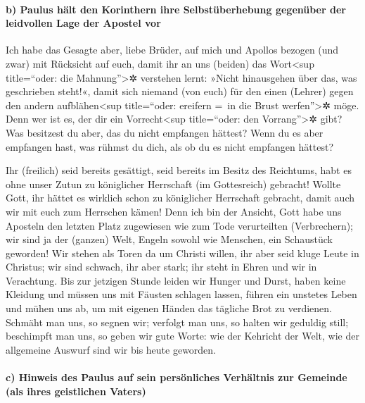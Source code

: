 \hypertarget{b-paulus-huxe4lt-den-korinthern-ihre-selbstuxfcberhebung-gegenuxfcber-der-leidvollen-lage-der-apostel-vor}{%
\paragraph{b) Paulus hält den Korinthern ihre Selbstüberhebung gegenüber
der leidvollen Lage der Apostel
vor}\label{b-paulus-huxe4lt-den-korinthern-ihre-selbstuxfcberhebung-gegenuxfcber-der-leidvollen-lage-der-apostel-vor}}

 Ich habe das Gesagte aber, liebe Brüder, auf mich und
Apollos bezogen (und zwar) mit Rücksicht auf euch, damit ihr an uns
(beiden) das Wort\textless sup title=``oder: die Mahnung''\textgreater✲
verstehen lernt: »Nicht hinausgehen über das, was geschrieben steht!«,
damit sich niemand (von euch) für den einen (Lehrer) gegen den andern
aufblähen\textless sup title=``oder: ereifern =~in die Brust
werfen''\textgreater✲ möge.  Denn wer ist es, der dir ein
Vorrecht\textless sup title=``oder: den Vorrang''\textgreater✲ gibt? Was
besitzest du aber, das du nicht empfangen hättest? Wenn du es aber
empfangen hast, was rühmst du dich, als ob du es nicht empfangen
hättest?

 Ihr (freilich) seid bereits gesättigt, seid bereits im
Besitz des Reichtums, habt es ohne unser Zutun zu königlicher Herrschaft
(im Gottesreich) gebracht! Wollte Gott, ihr hättet es wirklich schon zu
königlicher Herrschaft gebracht, damit auch wir mit euch zum Herrschen
kämen!  Denn ich bin der Ansicht, Gott habe uns Aposteln
den letzten Platz zugewiesen wie zum Tode verurteilten (Verbrechern);
wir sind ja der (ganzen) Welt, Engeln sowohl wie Menschen, ein
Schaustück geworden!  Wir stehen als Toren da um Christi
willen, ihr aber seid kluge Leute in Christus; wir sind schwach, ihr
aber stark; ihr steht in Ehren und wir in Verachtung. 
Bis zur jetzigen Stunde leiden wir Hunger und Durst, haben keine
Kleidung und müssen uns mit Fäusten schlagen lassen, führen ein unstetes
Leben  und mühen uns ab, um mit eigenen Händen das
tägliche Brot zu verdienen. Schmäht man uns, so segnen wir; verfolgt man
uns, so halten wir geduldig still;  beschimpft man uns,
so geben wir gute Worte: wie der Kehricht der Welt, wie der allgemeine
Auswurf sind wir bis heute geworden.

\hypertarget{c-hinweis-des-paulus-auf-sein-persuxf6nliches-verhuxe4ltnis-zur-gemeinde-als-ihres-geistlichen-vaters}{%
\paragraph{c) Hinweis des Paulus auf sein persönliches Verhältnis zur
Gemeinde (als ihres geistlichen
Vaters)}\label{c-hinweis-des-paulus-auf-sein-persuxf6nliches-verhuxe4ltnis-zur-gemeinde-als-ihres-geistlichen-vaters}}

